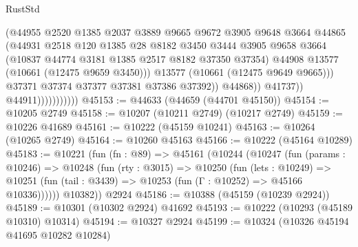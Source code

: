 \begin{lexlean}{RustStd}
\begin{coremodule}
                                      (@44955
                                        @2520
                                        @1385
                                        @2037
                                        @3889
                                        @9665
                                        @9672
                                        @3905
                                        @9648
                                        @3664
                                        @44865
                                        (@44931
                                          @2518
                                          @120
                                          @1385
                                          @28
                                          @8182
                                          @3450
                                          @3444
                                          @3905
                                          @9658
                                          @3664
                                          (@10837 @44774 @3181 @1385 @2517 @8182 @37350 @37354)
                                          @44908
                                          @13577
                                          (@10661 (@12475 @9659 @3450)))
                                        @13577
                                        (@10661 (@12475 @9649 @9665)))
                                      @37371
                                      @37374
                                      @37377
                                      @37381
                                      @37386
                                      @37392))
                                  @44868))
                              @41737))
                          @44911)))))))))))
@45153 := @44633 (@44659 (@44701 @45150))
@45154 := @10205 @2749
@45158 := @10207 (@10211 @2749) (@10217 @2749)
@45159 := @10226 @41689
@45161 := @10222 (@45159 @10241)
@45163 := @10264 (@10265 @2749)
@45164 := @10260 @45163
@45166 := @10222 (@45164 @10289)
@45183 := @10221
    (fun (fn : @89) =>
    @45161
      (@10244
        (@10247
          (fun (params : @10246) =>
          @10248
            (fun (rty : @3015) =>
            @10250
              (fun (lets : @10249) =>
              @10251 (fun (tail : @3439) => @10253 (fun (Γ : @10252) => @45166 @10336))))))
        @10382))
    @2924
@45186 := @10388 (@45159 (@10239 @2924))
@45189 := @10301 (@10302 @2924) @41692
@45193 := @10222 (@10293 (@45189 @10310) @10314)
@45194 := @10327 @2924
@45199 := @10324 (@10326 @45194 @41695 @10282 @10284)

\end{coremodule}
\end{lexlean}
